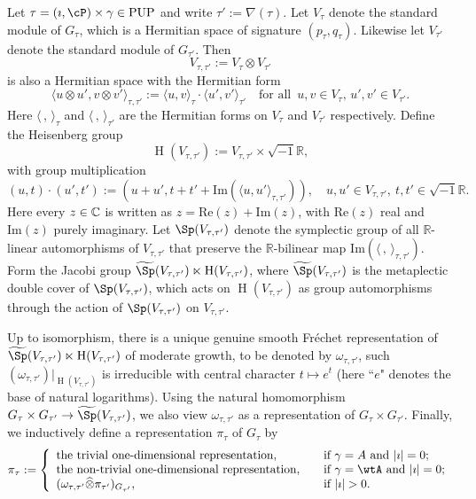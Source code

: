 \documentclass[11pt,a4paper]{amsart}
\def\abs#1{\left|{#1}\right|}
\newcommand{\oH}{\operatorname{H}}
\newcommand{\R}{\mathbb R}
\newcommand{\la}{\langle}
\newcommand{\ra}{\rangle}
\numberwithin{equation}{section}
\theoremstyle{remark}
\begin{document}
Let $\tau=(\imath, \cP)\times \gamma \in \mathrm{PUP}$ and write $\tau':=\nabla(\tau)$. Let $V_\tau$ denote the standard module of $G_\tau$, which is a Hermitian space of signature $(p_\tau, q_\tau)$. Likewise let $V_{\tau'}$ denote the standard module of $G_{\tau'}$. Then \[
  V_{\tau, \tau'}:=V_{\tau}\otimes V_{\tau'}
\]
is also a Hermitian space with the Hermitian form
\[
  \la u\otimes u', v\otimes v'\ra_{\tau, \tau'}:= \la u, v\ra_{\tau}\cdot  \la  u',  v'\ra_{\tau'}\quad \textrm{for all }\, u,v\in V_\tau, \,  u',v'\in V_{\tau'}.
\]
Here $\la \,, \, \ra_{\tau}$ and $\la \,, \, \ra_{\tau'}$ are the Hermitian forms on $V_\tau$ and $V_{\tau'}$ respectively. Define the Heisenberg group
\[
  \oH(V_{\tau, \tau'}):=V_{\tau, \tau'}\times \sqrt{-1}\R,
\]
with group multiplication 
\[
  (u,t)\cdot (u',t'):=(u+u', t+t'+\mathrm{Im}(\la u, u'\ra_{\tau, \tau'})), \quad u,u'\in V_{\tau, \tau'}, \ t,t'\in \sqrt{-1}\R.
\]
Here every $z\in \mathbb{C}$ is written as $z=\mathrm{Re}(z)+\mathrm{Im}(z)$, with  $\mathrm{Re}(z)$ real and $\mathrm{Im}(z)$ purely imaginary. Let $\Sp(V_{\tau, \tau'})$ denote the symplectic group of all $\R$-linear automorphisms of $V_{\tau, \tau'}$   that preserve the $\R$-bilinear map 
$\mathrm{Im}(\la \, ,\, \ra_{\tau, \tau'})$. Form the Jacobi group 
$\widetilde \Sp(V_{\tau, \tau'})\ltimes \oH(V_{\tau, \tau'})$, where 
$\widetilde \Sp(V_{\tau, \tau'})$ is the metaplectic double cover of $\Sp(V_{\tau, \tau'})$, which acts on $\oH(V_{\tau, \tau'})$ as group automorphisms through the action of $\Sp(V_{\tau, \tau'})$ on $V_{\tau, \tau'}$.

Up to isomorphism, there is a unique genuine smooth Fr\'echet representation of $\widetilde \Sp(V_{\tau, \tau'})\ltimes \oH(V_{\tau, \tau'})$ of moderate growth, to be denoted by $\omega_{\tau, \tau'}$, such $(\omega_{\tau, \tau'})|_{  \oH(V_{\tau, \tau'})}$ is irreducible with central character $t\mapsto e^t$ (here ``$e$" denotes the  base of natural logarithms). Using the natural homomorphism $G_\tau\times G_{\tau'}\rightarrow \widetilde \Sp(V_{\tau, \tau'})$, we also view $\omega_{\tau, \tau'}$ as a representation of $G_\tau\times G_{\tau'}$. Finally, we inductively define a representation $\pi_\tau$ of $G_\tau$ by
\[
\pi_\tau:=\left\{  \begin{array}{ll}
               \textrm{the trivial one-dimensional representation}, &\quad \textrm{if $\gamma=A$ and  $\abs{\imath}=0$};  \\
               \textrm{the non-trivial one-dimensional representation}, &\quad \textrm{if $\gamma=\wtA$ and  $\abs{\imath}=0$};  \\
               (\omega_{\tau, \tau'}\widehat \otimes  \pi_{\tau'})_{G_{\tau'}}, &\quad \textrm{if   $\abs{\imath}>0$}.
           \end{array}
           \right.
\]
 
\end{document}
